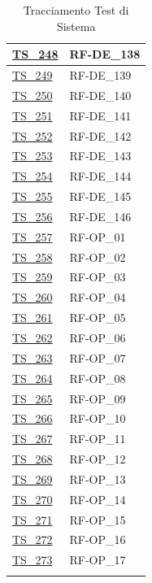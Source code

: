 \begin{longtable}{|
    >{\raggedright\arraybackslash}p{} |
    >{\centering\arraybackslash}p{} |
    }
    \hyperlink{ts-248}{TS\_248} & RF-DE\_138 \\ \hline
    \hyperlink{ts-249}{TS\_249} & RF-DE\_139 \\ \hline
    \hyperlink{ts-250}{TS\_250} & RF-DE\_140 \\ \hline
    \hyperlink{ts-251}{TS\_251} & RF-DE\_141 \\ \hline
    \hyperlink{ts-252}{TS\_252} & RF-DE\_142 \\ \hline
    \hyperlink{ts-253}{TS\_253} & RF-DE\_143 \\ \hline
    \hyperlink{ts-254}{TS\_254} & RF-DE\_144 \\ \hline
    \hyperlink{ts-255}{TS\_255} & RF-DE\_145 \\ \hline
    \hyperlink{ts-256}{TS\_256} & RF-DE\_146 \\ \hline
    \hyperlink{ts-257}{TS\_257} & RF-OP\_01 \\ \hline
    \hyperlink{ts-258}{TS\_258} & RF-OP\_02 \\ \hline
    \hyperlink{ts-259}{TS\_259} & RF-OP\_03 \\ \hline
    \hyperlink{ts-260}{TS\_260} & RF-OP\_04 \\ \hline
    \hyperlink{ts-261}{TS\_261} & RF-OP\_05 \\ \hline
    \hyperlink{ts-262}{TS\_262} & RF-OP\_06 \\ \hline
    \hyperlink{ts-263}{TS\_263} & RF-OP\_07 \\ \hline
    \hyperlink{ts-264}{TS\_264} & RF-OP\_08 \\ \hline
    \hyperlink{ts-265}{TS\_265} & RF-OP\_09 \\ \hline
    \hyperlink{ts-266}{TS\_266} & RF-OP\_10 \\ \hline
    \hyperlink{ts-267}{TS\_267} & RF-OP\_11 \\ \hline
    \hyperlink{ts-268}{TS\_268} & RF-OP\_12 \\ \hline
    \hyperlink{ts-269}{TS\_269} & RF-OP\_13 \\ \hline
    \hyperlink{ts-270}{TS\_270} & RF-OP\_14 \\ \hline
    \hyperlink{ts-271}{TS\_271} & RF-OP\_15 \\ \hline
    \hyperlink{ts-272}{TS\_272} & RF-OP\_16 \\ \hline
    \hyperlink{ts-273}{TS\_273} & RF-OP\_17 \\ \hline

    \caption{Tracciamento Test di Sistema}
\end{longtable}

